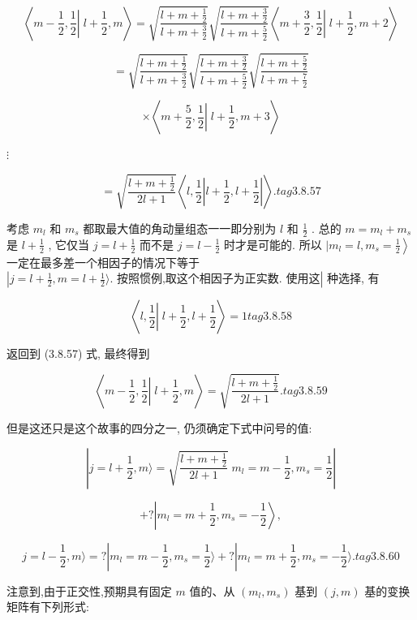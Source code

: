 $$
\left\langle {m - \frac{1}{2},\frac{1}{2}\left| {\;l + \frac{1}{2}, m}\right. }\right\rangle = \sqrt{\frac{l + m + \frac{1}{2}}{l + m + \frac{3}{2}}}\sqrt{\frac{l + m + \frac{3}{2}}{l + m + \frac{5}{2}}}\left\langle {m + \frac{3}{2},\frac{1}{2}\left| {\;l + \frac{1}{2}}\right., m + 2}\right\rangle
$$

$$
= \sqrt{\frac{l + m + \frac{1}{2}}{l + m + \frac{3}{2}}}\sqrt{\frac{l + m + \frac{3}{2}}{l + m + \frac{5}{2}}}\sqrt{\frac{l + m + \frac{5}{2}}{l + m + \frac{7}{2}}}
$$

$$
\times \left\langle {m + \frac{5}{2},\frac{1}{2}\left| {\;l + \frac{1}{2}}\right., m + 3}\right\rangle
$$

$\vdots$

$$
= \sqrt{\frac{l + m + \frac{1}{2}}{{2l} + 1}}\left\langle {l,\frac{1}{2}\left| {l + \frac{1}{2}, l + \frac{1}{2}}\right| }\right\rangle . tag{3.8.57}
$$

考虑 ${m}_{l}$ 和 ${m}_{s}$ 都取最大值的角动量组态一一即分别为 $l$ 和 $\frac{1}{2}$ . 总的 $m = {m}_{l} + {m}_{s}$ 是 $l + \frac{1}{2}$ , 它仅当 $j = l + \frac{1}{2}$ 而不是 $j = l - \frac{1}{2}$ 时才是可能的. 所以 $\left. {\mid {m}_{l} = l,{m}_{s} = \frac{1}{2}}\right\rangle$ 一定在最多差一个相因子的情况下等于 $\left| {j = l + \frac{1}{2}, m = l + \frac{1}{2}\rangle \text{. 按照惯例,取这个相因子为正实数. 使用这}}\right|$ 种选择, 有

$$
\left\langle {l,\frac{1}{2}\left| {\;l + \frac{1}{2}}\right., l + \frac{1}{2}}\right\rangle = 1 tag{3.8.58}
$$

返回到 (3.8.57) 式, 最终得到

$$
\left\langle {m - \frac{1}{2},\frac{1}{2}\left| {\;l + \frac{1}{2}}\right., m}\right\rangle = \sqrt{\frac{l + m + \frac{1}{2}}{{2l} + 1}}. tag{3.8.59}
$$

但是这还只是这个故事的四分之一, 仍须确定下式中问号的值:

$$
\left| {j = l + \frac{1}{2}, m\rangle = \sqrt{\frac{l + m + \frac{1}{2}}{{2l} + 1}}\;{m}_{l} = m - \frac{1}{2},{m}_{s} = \frac{1}{2}}\right|
$$

$$
+ ?\left| {{m}_{l} = m + \frac{1}{2},{m}_{s} = - \frac{1}{2}}\right\rangle ,
$$

$$
j = l - \frac{1}{2}, m\rangle = ?\left| {{m}_{l} = m - \frac{1}{2},{m}_{s} = \frac{1}{2}\rangle + ?}\right| {m}_{l} = m + \frac{1}{2},{m}_{s} = - \frac{1}{2}\rangle . tag{3.8.60}
$$

注意到,由于正交性,预期具有固定 $m$ 值的、从 $\left( {{m}_{l},{m}_{s}}\right)$ 基到 $\left( {j, m}\right)$ 基的变换矩阵有下列形式:

